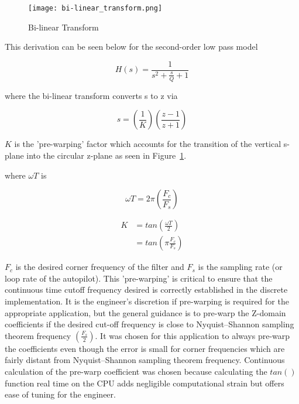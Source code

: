 \begin{figure}[h!]
 \centering
  \texttt{[image: bi-linear\_transform.png]}
  \caption{Bi-linear Transform}
  \label{fig:bi-linear_transform}
\end{figure}

This derivation can be seen below for the second-order low pass model

\begin{equation}
 H(s) = \frac{1}{s^2+\frac{s}{Q}+1}
\end{equation}

where the bi-linear transform converts s to z via

\begin{equation}
 s = \left(\frac{1}{K}\right)\left(\frac{z-1}{z+1}\right)
\end{equation}

$K$ is the 'pre-warping' factor which accounts for the transition of the vertical s-plane into the circular z-plane as seen in Figure~\ref{fig:bi-linear_transform}.

where $\omega T$ is

\begin{equation}
 \omega T = 2\pi\left(\frac{F_c}{F_s}\right)
\end{equation}

\begin{equation}
\begin{split}
 K &= tan\left(\frac{\omega T}{2}\right) \\
 &= tan\left(\pi\frac{F_c}{F_s}\right)
\end{split}
\end{equation}



$F_c$ is the desired corner frequency of the filter and $F_s$ is the sampling rate (or loop rate of the autopilot).
This 'pre-warping' is critical to ensure that the continuous time cutoff frequency desired is correctly established in the discrete implementation.  It is the engineer's discretion if pre-warping is required for the appropriate application, but the general guidance is to pre-warp the Z-domain coefficients if the desired cut-off frequency is close to Nyquist–Shannon sampling theorem frequency $(\frac{F_s}{2})$.  It was chosen for this application to always pre-warp the coefficients even though the error is small for corner frequencies which are fairly distant from Nyquist–Shannon sampling theorem frequency.  Continuous calculation of the pre-warp coefficient was chosen because calculating the $tan()$ function real time on the CPU adds negligible computational strain but offers ease of tuning for the engineer.

